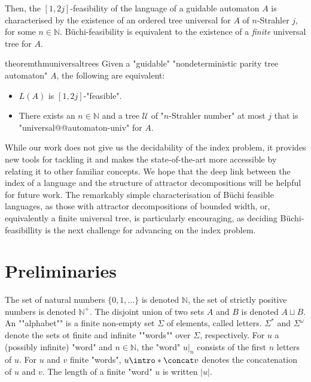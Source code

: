 \documentclass[a4paper,UKenglish,cleveref, autoref, thm-restate]{lipics-v2021}
\newif\ificalp
\newcommand{\NN}{\mathbb{N}}
\newcommand{\A}{{A}}
\newcommand{\U}{\mathcal{U}}
\begin{document}
 Then, the  $[1,2j]$-feasibility of the language of a guidable automaton $\A$ is characterised by the existence of an  ordered tree  universal for $\A$ of $n$-Strahler $j$, for some $n\in \NN$. B\"uchi-feasibility is equivalent to the existence of a \textit{finite} universal tree for $\A$.



\begin{restatable}{theorem}{thmuniversaltrees}\label{cl:universal-trees}
Given a "guidable" "nondeterministic parity tree automaton" $\A$, the following are equivalent:
\begin{itemize}
\item $L(\A)$ is $[1,2j]$-"feasible".
\item There exists an $n\in \NN$ and a tree $\U$ of "$n$-Strahler number" at most $j$  that is "universal@@automaton-univ" for $\A$.
\end{itemize}

\end{restatable}

\vspace{5mm}


While our work does not give us the decidability of the index problem, it provides new tools for tackling it and makes the state-of-the-art more accessible by relating it to other familiar concepts. We hope that the deep link between the index of a language and the structure of attractor decompositions will be helpful for future work. The remarkably simple characterisation of B\"uchi feasible languages, as those with attractor decompositions of bounded width, or, equivalently a finite universal tree, is particularly encouraging, as deciding B\"uchi-feasibillity is the next challenge for advancing on the index problem.


\ificalp
A full version of this article, with all the missing proofs, can be found on Arxiv \cite{fullversion}.
\fi
 	
\section{Preliminaries}\label{sec:definitions}




The set of natural numbers $\{0, 1, \dots\}$ is denoted $\NN$, the set of strictly positive numbers is denoted $\NN^+$. The disjoint union of two sets $A$ and $B$ is denoted $A \sqcup B$. 
An ""alphabet"" is a finite non-empty set $\Sigma$ of elements, called letters.
$\Sigma^*$ and $\Sigma^\omega$ denote the sets ot finite and infinite ""words"" over $\Sigma$, respectively.
For $u$ a (possibly infinite) "word" and $n\in \NN$, the "word" $u|_{n}$ consists of the first $n$ letters of $u$. For $u$ and $v$ finite "words", $u \intro*\concat v$ denotes the concatenation of $u$ and $v$.
The length of a finite "word" $u$ is written $|u|$.
\end{document}

